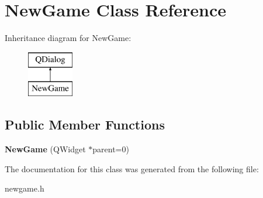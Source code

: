 \hypertarget{class_new_game}{\section{New\+Game Class Reference}
\label{class_new_game}
}
Inheritance diagram for New\+Game\+:\begin{figure}[H]
\begin{center}
\leavevmode
\includegraphics[height=2.000000cm]{class_new_game}
\end{center}
\end{figure}
\subsection*{Public Member Functions}
\begin{DoxyCompactItemize}
\item 
\hypertarget{class_new_game_abc0dccbe2a43eef32570473265de9a8a}{{\bfseries New\+Game} (Q\+Widget $\ast$parent=0)}\label{class_new_game_abc0dccbe2a43eef32570473265de9a8a}

\end{DoxyCompactItemize}


The documentation for this class was generated from the following file\+:\begin{DoxyCompactItemize}
\item 
newgame.\+h\end{DoxyCompactItemize}
